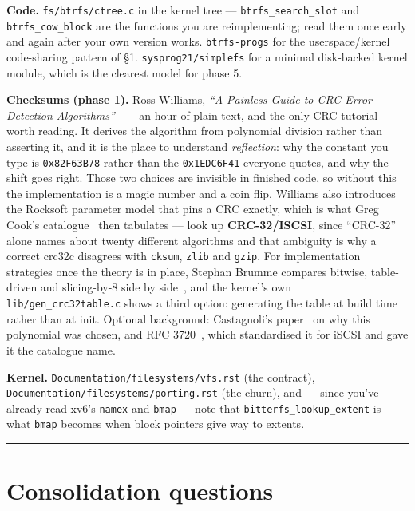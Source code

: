 \textbf{Code.} \texttt{fs/btrfs/ctree.c} in the kernel tree --- \texttt{btrfs\_search\_slot} and
\texttt{btrfs\_cow\_block} are the functions you are reimplementing; read them once early and again
after your own version works. \texttt{btrfs-progs} for the userspace/kernel code-sharing pattern
of §1. \texttt{sysprog21/simplefs} for a minimal disk-backed kernel module, which is the clearest
model for phase 5.

\textbf{Checksums (phase 1).} Ross Williams, \emph{``A Painless Guide to CRC Error Detection
Algorithms''}~\cite{Williams_1993} --- an hour of plain text, and the only CRC tutorial worth
reading. It derives the algorithm from polynomial division rather than asserting it, and it is the
place to understand \emph{reflection}: why the constant you type is \texttt{0x82F63B78} rather than
the \texttt{0x1EDC6F41} everyone quotes, and why the shift goes right. Those two choices are
invisible in finished code, so without this the implementation is a magic number and a coin flip.
Williams also introduces the Rocksoft parameter model that pins a CRC exactly, which is what Greg
Cook's catalogue~\cite{crc_catalogue} then tabulates --- look up \textbf{CRC-32/ISCSI}, since
``CRC-32'' alone names about twenty different algorithms and that ambiguity is why a correct
crc32c disagrees with \texttt{cksum}, \texttt{zlib} and \texttt{gzip}. For implementation
strategies once the theory is in place, Stephan Brumme compares bitwise, table-driven and
slicing-by-8 side by side~\cite{brumme_crc32}, and the kernel's own
\texttt{lib/gen\_crc32table.c} shows a third option: generating the table at build time rather
than at init. Optional background: Castagnoli's paper~\cite{Castagnoli_1993} on why this
polynomial was chosen, and RFC 3720~\cite{rfc3720}, which standardised it for iSCSI and gave it
the catalogue name.

\textbf{Kernel.} \texttt{Documentation/filesystems/vfs.rst} (the contract),
\texttt{Documentation/filesystems/porting.rst} (the churn), and --- since you've already read xv6's
\texttt{namex} and \texttt{bmap} --- note that \texttt{bitterfs\_lookup\_extent} is what \texttt{bmap} becomes when block
pointers give way to extents.

\begin{center}\rule{0.5\linewidth}{0.5pt}\end{center}

\hypertarget{consolidation-questions}{%
\section{Consolidation questions}\label{consolidation-questions}}

